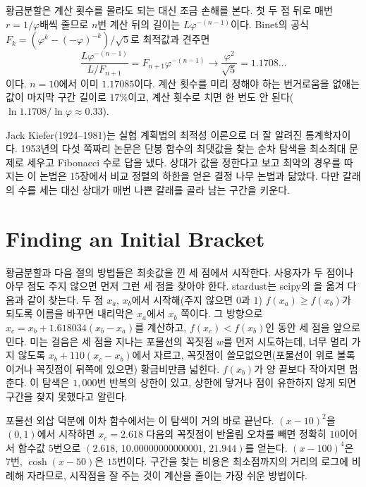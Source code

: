 황금분할은 계산 횟수를 몰라도 되는 대신 조금 손해를 본다. 첫 두 점 뒤로 매번 $r=1/\varphi$배씩 줄므로 $n$번 계산 뒤의 길이는 $L\varphi^{-(n-1)}$이다. Binet의 공식 $F_k=(\varphi^k-(-\varphi)^{-k})/\sqrt5$로 최적값과 견주면
\[
\frac{L\varphi^{-(n-1)}}{L/F_{n+1}}=F_{n+1}\varphi^{-(n-1)}\longrightarrow\frac{\varphi^2}{\sqrt5}=1.1708\ldots
\]
이다. $n=10$에서 이미 $1.17085$이다. 계산 횟수를 미리 정해야 하는 번거로움을 없애는 값이 마지막 구간 길이로 $17\%$이고, 계산 횟수로 치면 한 번도 안 된다($\ln1.1708/\ln\varphi\approx0.33$).

\begin{aside}[Kiefer와 탐색 이론]
Jack Kiefer(1924--1981)는 실험 계획법의 최적성 이론으로 더 잘 알려진 통계학자이다. 1953년의 다섯 쪽짜리 논문은 단봉 함수의 최댓값을 찾는 순차 탐색을 최소최대 문제로 세우고 Fibonacci 수로 답을 냈다. 상대가 값을 정한다고 보고 최악의 경우를 따지는 이 논법은 15장에서 비교 정렬의 하한을 얻은 결정 나무 논법과 닮았다. 다만 갈래의 수를 세는 대신 상대가 매번 나쁜 갈래를 골라 남는 구간을 키운다.
\end{aside}

\section{Finding an Initial Bracket}
\label{sec:find-bracket}

황금분할과 다음 절의 방법들은 최솟값을 낀 세 점에서 시작한다. 사용자가 두 점이나 아무 점도 주지 않으면 먼저 그런 세 점을 찾아야 한다. stardust는 scipy의 을 옮겨 다음과 같이 찾는다. 두 점 $x_a$, $x_b$에서 시작해(주지 않으면 $0$과 $1$) $f(x_a)\ge f(x_b)$가 되도록 이름을 바꾸면 내리막은 $x_a$에서 $x_b$ 쪽이다. 그 방향으로 $x_c=x_b+1.618034(x_b-x_a)$를 계산하고, $f(x_c)<f(x_b)$인 동안 세 점을 앞으로 민다. 미는 걸음은 세 점을 지나는 포물선의 꼭짓점 $w$를 먼저 시도하는데, 너무 멀리 가지 않도록 $x_b+110(x_c-x_b)$에서 자르고, 꼭짓점이 쓸모없으면(포물선이 위로 볼록이거나 꼭짓점이 뒤쪽에 있으면) 황금비만큼 넓힌다. $f(x_b)$가 양 끝보다 작아지면 멈춘다. 이 탐색은 $1{,}000$번 반복의 상한이 있고, 상한에 닿거나 점이 유한하지 않게 되면 구간을 찾지 못했다고 알린다.

포물선 외삽 덕분에 이차 함수에서는 이 탐색이 거의 바로 끝난다. $(x-10)^2$을 $(0,1)$에서 시작하면 $x_c=2.618$ 다음의 꼭짓점이 반올림 오차를 빼면 정확히 $10$이어서 함수값 $5$번으로 $(2.618,\,10.00000000000001,\,21.944)$를 얻는다. $(x-100)^4$은 $7$번, $\cosh(x-50)$은 $15$번이다. 구간을 찾는 비용은 최소점까지의 거리의 로그에 비례해 자라므로, 시작점을 잘 주는 것이 계산을 줄이는 가장 쉬운 방법이다.

